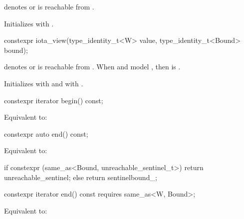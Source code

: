 \begin{itemdescr}
\pnum
\expects
{} denotes  or
 is reachable from .

\pnum
\effects
Initializes  with .
\end{itemdescr}

%
\begin{itemdecl}
constexpr iota_view(type_identity_t<W> value, type_identity_t<Bound> bound);
\end{itemdecl}

\begin{itemdescr}
\pnum
\expects
{} denotes  or
 is reachable from .
When  and  model ,
then  is .

\pnum
\effects
Initializes  with  and
 with .
\end{itemdescr}

%
\begin{itemdecl}
constexpr iterator begin() const;
\end{itemdecl}

\begin{itemdescr}
\pnum
\effects
Equivalent to: 
\end{itemdescr}

%
\begin{itemdecl}
constexpr auto end() const;
\end{itemdecl}

\begin{itemdescr}
\pnum
\effects
Equivalent to:
\begin{codeblock}
if constexpr (same_as<Bound, unreachable_sentinel_t>)
  return unreachable_sentinel;
else
  return sentinel{bound_};
\end{codeblock}
\end{itemdescr}

%
\begin{itemdecl}
constexpr iterator end() const requires same_as<W, Bound>;
\end{itemdecl}

\begin{itemdescr}
\pnum
\effects
Equivalent to: 
\end{itemdescr}

